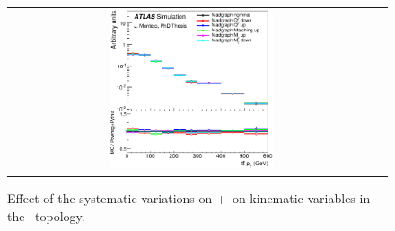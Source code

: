 \begin{figure}[p]
\begin{center}
\begin{tabular}{cc}
\includegraphics[width=0.46\textwidth]{Modeling/Figures/mgcc_tt1cq_ttbar_pt_norm.eps} \\
\end{tabular}
\caption{Effect of the systematic variations on \madgraph+\pythia\ on kinematic variables in the \ttc\ topology.}
\label{fig:mgcc_tt1c}
\end{center}
\end{figure}
